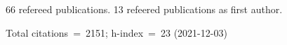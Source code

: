 66 refereed publications. 13 refeered publications as first author.

Total citations~=~2151; h-index~=~23 (2021-12-03)